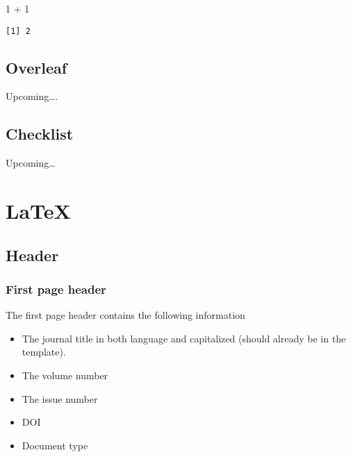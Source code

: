 \documentclass[
  letterpaper,
  DIV=11,
  numbers=noendperiod]{scrreprt}
\newenvironment{Shaded}{\begin{snugshade}}{\end{snugshade}}
\newcommand{\DecValTok}[1]{\textcolor[rgb]{0.68,0.00,0.00}{#1}}
\newcommand{\SpecialCharTok}[1]{\textcolor[rgb]{0.37,0.37,0.37}{#1}}
\providecommand{\tightlist}{%
  \setlength{\itemsep}{0pt}\setlength{\parskip}{0pt}}\usepackage{longtable,booktabs,array}
\begin{document}
\begin{Shaded}
\begin{Highlighting}[]
\DecValTok{1} \SpecialCharTok{+} \DecValTok{1}
\end{Highlighting}
\end{Shaded}

\begin{verbatim}
[1] 2
\end{verbatim}

\chapter*{Overleaf}\label{overleaf}


Upcoming\ldots.

\chapter*{Checklist}\label{checklist}


Upcoming\ldots{}

\part{LaTeX}

\chapter*{Header}\label{header}


\section*{First page header}\label{first-page-header}


The first page header contains the following information

\begin{itemize}
\tightlist
\item
  The journal title in both language and capitalized (should already be
  in the template).
\item
  The volume number
\item
  The issue number
\item
  DOI
\item
  Document type
\end{itemize}
\end{document}

